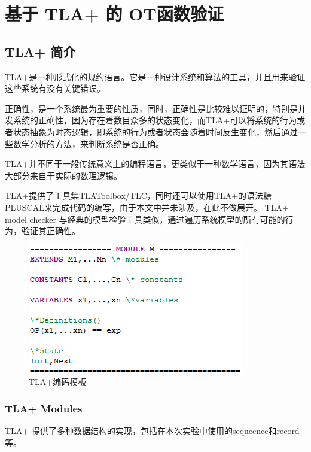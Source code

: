 \chapter{基于 TLA+ 的 OT函数验证} 
\label{chapter:proof}
\section{TLA+ 简介}
\par TLA+是一种形式化的规约语言。它是一种设计系统和算法的工具，并且用来验证这些系统有没有关键错误。
\par 正确性，是一个系统最为重要的性质，同时，正确性是比较难以证明的，特别是并发系统的正确性，因为存在着数目众多的状态变化，而TLA+可以将系统的行为或者状态抽象为时态逻辑，即系统的行为或者状态会随着时间反生变化，然后通过一些数学分析的方法，来判断系统是否正确。

\par TLA+并不同于一般传统意义上的编程语言，更类似于一种数学语言，因为其语法大部分来自于实际的数理逻辑。
\par TLA+提供了工具集TLAToolbox/TLC，同时还可以使用TLA+的语法糖PLUSCAL来完成代码的编写，由于本文中并未涉及，在此不做展开。
TLA+ model checker 与经典的模型检验工具类似，通过遍历系统模型的所有可能的行为，验证其正确性。

\begin{figure}[H]
\centering
\includegraphics{figures/module.png}
\caption{TLA+编码模板}
\label{fig:graph}
\end{figure}

\subsection{TLA+ Modules}
TLA+ 提供了多种数据结构的实现，包括在本次实验中使用的sequecnce和record等。

